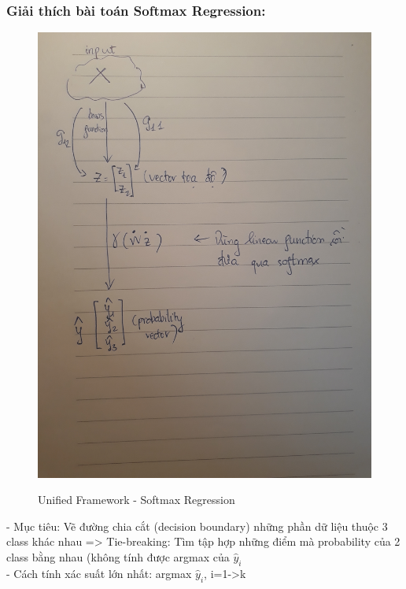 \documentclass{article}
\begin{document}
\subsubsection{Giải thích bài toán Softmax Regression:}
\begin{figure}[ht]

\begin{center}

\includegraphics[scale=0.1]{20190703_001318.jpg}\\

\end{center}

\caption{Unified Framework - Softmax Regression}

\end{figure}
-  Mục tiêu: Vẽ đường chia cắt (decision boundary) những phần dữ liệu thuộc 3 class khác nhau  => Tie-breaking: Tìm tập hợp những điểm mà probability của 2 class bằng nhau (không tính được argmax của $\hat{y}_i$\\
- Cách tính xác suất lớn nhất: argmax $\hat{y}_i$, i=1->k
\end{document}
